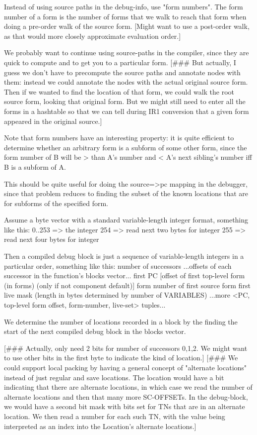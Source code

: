 Instead of using source paths in the debug-info, use "form numbers".  The form
number of a form is the number of forms that we walk to reach that form when
doing a pre-order walk of the source form.  [Might want to use a post-order
walk, as that would more closely approximate evaluation order.]


We probably want to continue using source-paths in the compiler, since they are
quick to compute and to get you to a particular form.  [\#\#\# But actually, I
guess we don't have to precompute the source paths and annotate nodes with
them: instead we could annotate the nodes with the actual original source form.
Then if we wanted to find the location of that form, we could walk the root
source form, looking that original form.  But we might still need to enter all
the forms in a hashtable so that we can tell during IR1 conversion that a given
form appeared in the original source.]


Note that form numbers have an interesting property: it is quite efficient to
determine whether an arbitrary form is a subform of some other form, since the
form number of B will be > than A's number and < A's next sibling's number iff
B is a subform of A.  

This should be quite useful for doing the source=>pc mapping in the debugger,
since that problem reduces to finding the subset of the known locations that
are for subforms of the specified form.


Assume a byte vector with a standard variable-length integer format, something
like this:
    0..253 => the integer
    254 => read next two bytes for integer
    255 => read next four bytes for integer

Then a compiled debug block is just a sequence of variable-length integers in a
particular order, something like this:
    number of successors
    ...offsets of each successor in the function's blocks vector...
    first PC
    [offset of first top-level form (in forms) (only if not component default)]
    form number of first source form
    first live mask (length in bytes determined by number of VARIABLES)
    ...more <PC, top-level form offset, form-number, live-set> tuples...

We determine the number of locations recorded in a block by the finding the
start of the next compiled debug block in the blocks vector.

[\#\#\# Actually, only need 2 bits for number of successors {0,1,2}.  We might
want to use other bits in the first byte to indicate the kind of location.]
[\#\#\# We could support local packing by having a general concept of "alternate
locations" instead of just regular and save locations.  The location would have
a bit indicating that there are alternate locations, in which case we read the
number of alternate locations and then that many more SC-OFFSETs.  In the
debug-block, we would have a second bit mask with bits set for TNs that are in
an alternate location.  We then read a number for each such TN, with the value
being interpreted as an index into the Location's alternate locations.]



